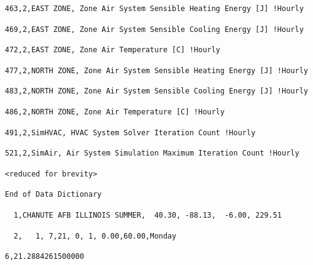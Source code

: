 \begin{lstlisting}
463,2,EAST ZONE, Zone Air System Sensible Heating Energy [J] !Hourly
\end{lstlisting}

\begin{lstlisting}
469,2,EAST ZONE, Zone Air System Sensible Cooling Energy [J] !Hourly
\end{lstlisting}

\begin{lstlisting}
472,2,EAST ZONE, Zone Air Temperature [C] !Hourly
\end{lstlisting}

\begin{lstlisting}
477,2,NORTH ZONE, Zone Air System Sensible Heating Energy [J] !Hourly
\end{lstlisting}

\begin{lstlisting}
483,2,NORTH ZONE, Zone Air System Sensible Cooling Energy [J] !Hourly
\end{lstlisting}

\begin{lstlisting}
486,2,NORTH ZONE, Zone Air Temperature [C] !Hourly
\end{lstlisting}

\begin{lstlisting}
491,2,SimHVAC, HVAC System Solver Iteration Count !Hourly
\end{lstlisting}

\begin{lstlisting}
521,2,SimAir, Air System Simulation Maximum Iteration Count !Hourly
\end{lstlisting}

\begin{lstlisting}
<reduced for brevity>
\end{lstlisting}

\begin{lstlisting}
End of Data Dictionary
\end{lstlisting}

\begin{lstlisting}
  1,CHANUTE AFB ILLINOIS SUMMER,  40.30, -88.13,  -6.00, 229.51
\end{lstlisting}

\begin{lstlisting}
  2,   1, 7,21, 0, 1, 0.00,60.00,Monday
\end{lstlisting}

\begin{lstlisting}
6,21.2884261500000
\end{lstlisting}

